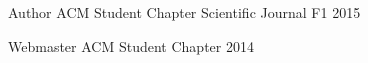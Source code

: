 

\begin{cvhonors}

  \cvhonor
    {Author} %
    {ACM Student Chapter Scientific Journal F1} %
    {} %
    {2015} %

  \cvhonor
    {Webmaster} %
    {ACM Student Chapter} %
    {} %
    {2014} %

\end{cvhonors}

